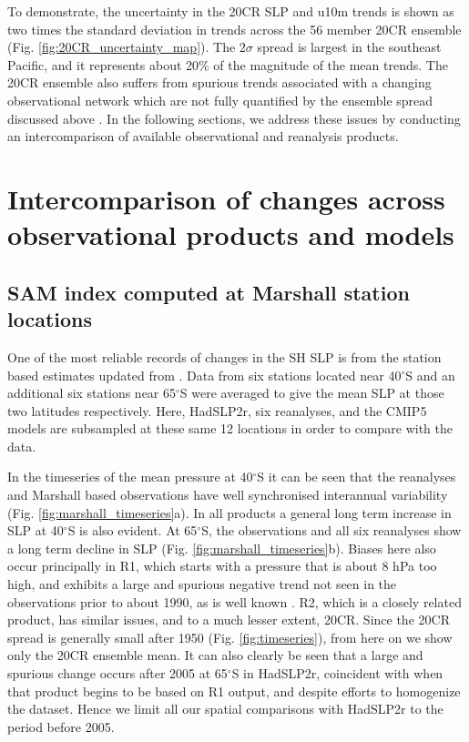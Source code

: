 \documentclass{ametsoc}
\begin{document}
To demonstrate, the uncertainty in the 
20CR SLP and u10m trends is shown as two times the standard deviation in trends across the 56 member 
20CR ensemble (Fig. \ref{fig:20CR_uncertainty_map}). The $2 \sigma$ spread is largest in the southeast
Pacific, and it represents about 20\% of the magnitude of the mean trends. The 20CR ensemble also suffers 
from spurious trends associated with a changing observational network which are not fully quantified by 
the ensemble spread discussed above \citep{Wang_et_al_2013}. In the following sections, we address these issues 
by conducting an intercomparison of available observational and reanalysis products.

\section{Intercomparison of changes across observational products and models} \label{sec:obs-intercomp}
\subsection{SAM index computed at Marshall station locations}
One of the most reliable records of changes in the SH SLP is from the station based estimates
updated from \cite{Marshall_2003}. Data from six stations located near 40$^{\circ}$S and 
an additional six stations near 65$^{\circ}$S were averaged to give the mean SLP at those two
latitudes respectively. Here, HadSLP2r, six reanalyses, and the CMIP5 models are subsampled
at these same 12 locations in order to compare with the \cite{Marshall_2003} data.

In the timeseries of the mean pressure at 40$^{\circ}$S it can be seen that the reanalyses
and Marshall based observations have well synchronised interannual variability (Fig. \ref{fig:marshall_timeseries}a).
In all products a general long term increase in SLP at 40$^{\circ}$S is also evident. At 65$^{\circ}$S, 
the observations and all six reanalyses show a long term decline in 
SLP (Fig. \ref{fig:marshall_timeseries}b). Biases here also occur principally in R1, which starts 
with a pressure that is about 
8 hPa too high, and exhibits a large and spurious negative trend not seen in the 
observations prior to about 1990, as is well known \citep{Marshall_2003}. R2, which 
is a closely related product, has similar issues, and to a much lesser extent, 20CR. 
Since the 20CR spread is generally small after 1950 (Fig. \ref{fig:timeseries}), 
from here on we show only the 20CR ensemble mean.
It can also clearly be seen that a large and spurious change occurs after 2005 at 65$^{\circ}$S in HadSLP2r,
coincident with when that product begins to be based on R1 output, and despite efforts to 
homogenize the dataset. Hence we limit all our spatial comparisons with HadSLP2r to the period before
2005.
\end{document}
